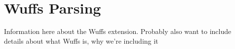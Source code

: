 \documentclass[main.tex]{subfiles}
\begin{document}
\section*{Wuffs Parsing}
Information here about the Wuffs extension. Probably also want to include
details about what Wuffs is, why we're including it
\end{document}
